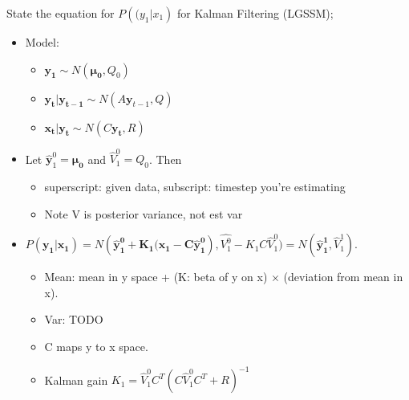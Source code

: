 \documentclass{article}
\begin{document}
State the equation for $P(\mathbf(y_1|x_1)$ for Kalman Filtering (LGSSM); \begin{itemize}
    \item Model: \begin{itemize}
            \item $\mathbf{y_1}\sim N(\mathbf{\mu_0},Q_0)$
            \item $\mathbf{y_t|y_{t-1}}\sim N(A\mathbf{y}_{t-1}, Q)$
            \item $\mathbf{x_t|y_t}\sim N(C\mathbf{y_t},R)$
        \end{itemize}
    \item Let $\hat{\mathbf{y}}^0_1=\mathbf{\mu_0}$ and $\hat{V}^0_1=Q_0$. Then
    \begin{itemize}
        \item superscript: given data, subscript: timestep you're estimating
        \item Note V is posterior variance, not est var
    \end{itemize}
    \item $P(\mathbf{y_1|x_1})=N(\mathbf{\hat{y}_1^0+K_1(\mathbf{x_1}-C\hat{\mathbf{y}}^0_1}), \hat{V^0_1}-K_1C\hat{V}^0_1)=N(\mathbf{\hat{y}^1_1}, \hat{V}^1_1)$.
    \begin{itemize}
        \item Mean: mean in y space + (K: beta of y on x) $\times$ (deviation from mean in x).
        \item Var: TODO
        \item C maps y to x space.
        \item Kalman gain $K_1=\hat{V}^0_1C^T(C\hat{V}^0_1C^T+R)^{-1}$
    \end{itemize}
\end{itemize}
    
\end{document}
